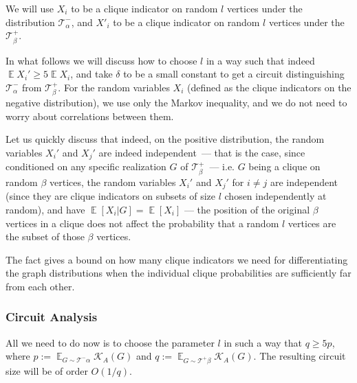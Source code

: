 \documentclass[10pt,a4paper]{article}
\DeclareMathOperator{\E}{\mathbb{E}}
\begin{document}
We will use $X_i$ to be a clique indicator on random $l$ vertices under the distribution $\mathcal{T}^-_{\alpha}$, and $X'_i$ to be a clique indicator on random $l$ vertices under the $\mathcal{T}^+_{\beta}$.

In what follows we will discuss how to choose $l$ in a way such that indeed $\E X_i' \geq 5 \E X_i$, and take $\delta$ to be a small constant to get a circuit distinguishing $\mathcal{T}^-_{\alpha}$ from $\mathcal{T}^+_\beta$. For the random variables $X_i$ (defined as the clique indicators on the negative distribution), we use only the Markov inequality, and we do not need to worry about correlations between them. 

Let us quickly discuss that indeed, on the positive distribution, the random variables $X_i'$ and $X_j'$ are indeed independent~--- that is the case, since conditioned on any specific realization $G$ of $\mathcal{T}^+_{\beta}$~--- i.e. $G$ being a clique on random $\beta$ vertices, the random variables $X_{i}'$ and $X_j'$ for $i\not=j$ are independent (since they are clique indicators on subsets of size $l$ chosen independently at random), and have $\E[X_i | G] = \E [X_i]$ --- the position of the original $\beta$ vertices in a clique does not affect the probability that a random $l$ vertices are the subset of those $\beta$ vertices.

The fact gives a bound on how many clique indicators we need for differentiating the graph distributions when the individual clique probabilities are sufficiently far from each other.

\subsubsection*{Circuit Analysis}

All we need to do now is to choose the parameter $l$ in such a way that $q \geq 5p$, where $p := \E_{G\sim \mathcal{T}^-{\alpha}} \mathcal{K}_A(G)$ and $q := \E_{G\sim \mathcal{T}^+{\beta}} \mathcal{K}_A(G)$. The resulting circuit size will be of order $O(1/q)$.
\end{document}
